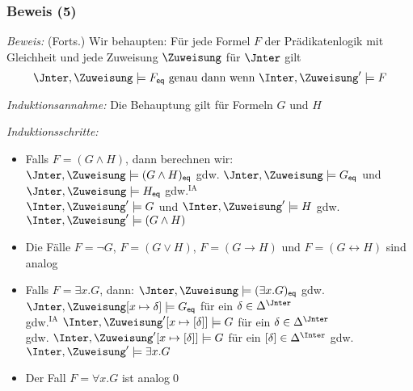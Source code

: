 \documentclass[aspectratio=1610,onlymath]{beamer}
\begin{document}
\begin{frame}[t]\frametitle{Beweis (5)}


\emph{Beweis:} {\footnotesize(Forts.)}
Wir behaupten: Für jede Formel $F$ der Prädikatenlogik mit Gleichheit und jede Zuweisung $\Zuweisung$ für $\Jnter$ gilt
\[ \Jnter,\Zuweisung\models F_{\eqpred} \text{ genau dann wenn } \Inter,\Zuweisung'\models F \]


\emph{Induktionsannahme:} Die Behauptung gilt für Formeln $G$ und $H$ \medskip\pause

\emph{Induktionsschritte:}
\begin{itemize}
\item Falls $F=(G\wedge H)$, dann berechnen wir:\pause\\
$\Jnter,\Zuweisung\models (G\wedge H)_{\eqpred}$
\alert{gdw.} $\Jnter,\Zuweisung\models G_{\eqpred}$ und $\Jnter,\Zuweisung\models H_{\eqpred}$ \pause\alert{gdw.${}^{\text{IA}}$}\\
$\Inter,\Zuweisung'\models G$ und $\Inter,\Zuweisung'\models H$ \pause\alert{gdw.} $\Inter,\Zuweisung'\models (G\wedge H)$\pause
\item Die Fälle $F=\neg G$, $F=(G\vee H)$, $F=(G\to H)$ und $F=(G\leftrightarrow H)$ sind analog\pause
\item Falls $F=\exists x.G$, dann: $\Jnter,\Zuweisung\models (\exists x.G)_{\eqpred}$ \alert{gdw.}
$\Jnter,\Zuweisung[x\mapsto \delta]\models G_{\eqpred}$ für ein $\delta\in\Delta^\Jnter$\\
\pause\alert{gdw.${}^{\text{IA}}$}
$\Inter,\Zuweisung'[x\mapsto [\delta]]\models G$ für ein $\delta\in\Delta^\Jnter$
 \pause\\\alert{gdw.}
 $\Inter,\Zuweisung'[x\mapsto [\delta]]\models G$ für ein $[\delta]\in\Delta^\Inter$
\alert{gdw.} $\Inter,\Zuweisung'\models \exists x.G$\pause
\item Der Fall $F=\forall x.G$ ist analog\qed
\end{itemize}
\end{frame}
\end{document}
